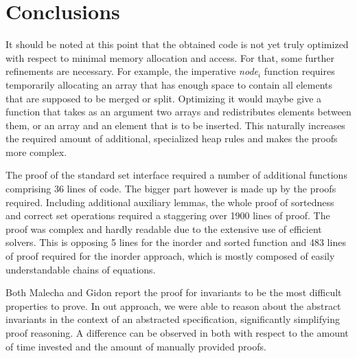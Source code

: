 

\chapter{Conclusions}\label{chapter:conclusion}


It should be noted at this point that the obtained code is not yet
truly optimized with respect to minimal memory allocation and access.
For that, some further refinements are necessary.
For example, the imperative \textit{node$_i$} function
requires temporarily allocating
an array that has enough space to contain
all elements that are supposed to be merged or split.
Optimizing it would maybe give a function that takes
as an argument two arrays and redistributes elements between them,
or an array and an element that is to be inserted.
This naturally increases the required amount of additional,
specialized heap rules and makes the proofs more complex.

The proof of the standard set interface required a number of additional functions
comprising 36 lines of code.
The bigger part however is made up by the proofs required.
Including additional auxiliary lemmas, the whole proof of sortedness
and correct set operations required a staggering over 1900 lines of proof.
The proof was complex and hardly readable due to the 
extensive use of efficient solvers.
This is opposing 5 lines for the inorder and sorted function and
483 lines of proof required for the inorder approach,
which is mostly composed of easily understandable chains of equations.

Both Malecha and Gidon report the proof for invariants
to be the most difficult properties to prove.
In out approach, we were able to reason about the abstract invariants
in the context of an abstracted specification,
significantly simplifying proof reasoning.
A difference can be observed in \label{fig:proof-comparison}
both with respect to the amount of 
time invested and the amount of manually provided proofs.

